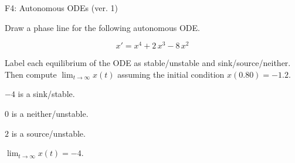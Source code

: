 \begin{exercise}
  \begin{exerciseTitle}F4: Autonomous ODEs (ver. 1)\end{exerciseTitle}
  \begin{exerciseStatement}
    

      Draw a phase line for the following 
      autonomous ODE.
    

    
\[x'= x^{4} + 2 \, x^{3} - 8 \, x^{2}\]

    

      Label each equilibrium of the ODE
      as stable/unstable and sink/source/neither.
      Then compute \(\lim_{t\to\infty}x(t)\)
      assuming the initial condition
      \(x( 0.80 )= -1.2\).
    

  \end{exerciseStatement}
  \begin{exerciseAnswer}
    

      \(-4\) is a sink/stable.
      
        \(0\) is a neither/unstable.
      
      \(2\) is a source/unstable.
    

    

      \(\lim_{t\to\infty}x(t)=-4\).
    

  \end{exerciseAnswer}
\end{exercise}